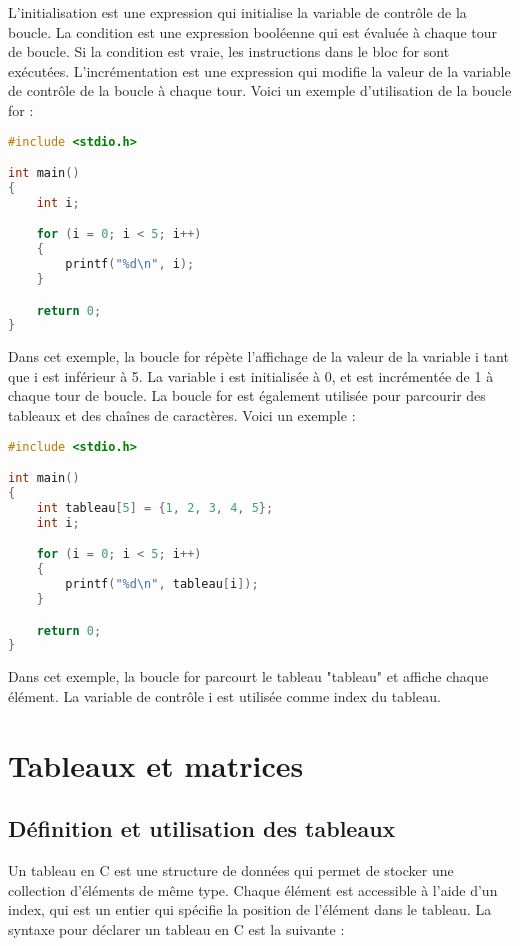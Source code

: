 \documentclass{uofa-eng-assignment}
\begin{document}
\noindent \newline
L'initialisation est une expression qui initialise la variable de contrôle de la boucle. La condition est une expression booléenne qui est évaluée à chaque tour de boucle. Si la condition est vraie, les instructions dans le bloc for sont exécutées. L'incrémentation est une expression qui modifie la valeur de la variable de contrôle de la boucle à chaque tour.
\newline \newline
Voici un exemple d'utilisation de la boucle for :

\begin{lstlisting}[language=c]
#include <stdio.h>

int main()
{
    int i;

    for (i = 0; i < 5; i++)
    {
        printf("%d\n", i);
    }

    return 0;
}
\end{lstlisting}

\noindent \newline
Dans cet exemple, la boucle for répète l'affichage de la valeur de la variable i tant que i est inférieur à 5. La variable i est initialisée à 0, et est incrémentée de 1 à chaque tour de boucle.
\newline \newline
La boucle for est également utilisée pour parcourir des tableaux et des chaînes de caractères. Voici un exemple :

\begin{lstlisting}[language=c]
#include <stdio.h>

int main()
{
    int tableau[5] = {1, 2, 3, 4, 5};
    int i;

    for (i = 0; i < 5; i++)
    {
        printf("%d\n", tableau[i]);
    }

    return 0;
}
\end{lstlisting}

\noindent \newline
Dans cet exemple, la boucle for parcourt le tableau "tableau" et affiche chaque élément. La variable de contrôle i est utilisée comme index du tableau.

\section{Tableaux et matrices}
\subsection{Définition et utilisation des tableaux}
Un tableau en C est une structure de données qui permet de stocker une collection d'éléments de même type. Chaque élément est accessible à l'aide d'un index, qui est un entier qui spécifie la position de l'élément dans le tableau.
\newline \newline
La syntaxe pour déclarer un tableau en C est la suivante :
\end{document}
